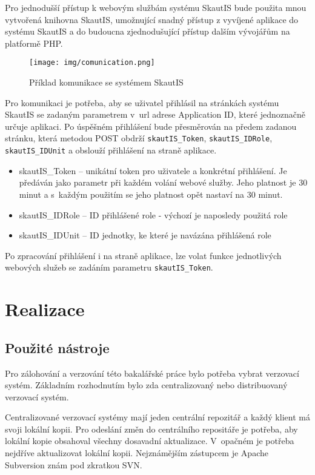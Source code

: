 \documentclass[thesis=B,czech]{FITthesis}[2012/04/27]
\begin{document}
Pro jednodušší přístup k webovým službám systému SkautIS bude použita mnou vytvořená knihovna SkautIS, umožnující snadný přístup z vyvíjené aplikace do systému SkautIS a do budoucna zjednodušující přístup dalším vývojářům na platformě PHP.

\begin{figure}[h] \centering
 	\texttt{[image: img/comunication.png]}
 	\caption[SkautIS]{Příklad komunikace se systémem SkautIS}\label{fig:comunication-diagram}
\end{figure}

Pro komunikaci je potřeba, aby se uživatel přihlásil na stránkách systému SkautIS se zadaným parametrem v~url adrese Application ID, které jednoznačně určuje aplikaci. Po úspěšném přihlášení bude přesměrován na předem zadanou stránku, která metodou POST obdrží \texttt{skautIS\_Token}, \texttt{skautIS\_ID\-Role}, \texttt{skautIS\_IDUnit} a obslouží přihlášení na straně aplikace.

\begin{itemize}
	\item skautIS\_Token -- unikátní token pro uživatele a konkrétní přihlášení. Je předáván jako parametr při každém volání webové služby. Jeho platnost je 30 minut a s~každým použitím se jeho platnost opět nastaví na 30 minut. 
	\item skautIS\_IDRole -- ID přihlášené role - výchozí je naposledy použitá role 
	\item skautIS\_IDUnit -- ID jednotky, ke které je navázána přihlášená role 
\end{itemize}

Po zpracování přihlášení i na straně aplikace, lze volat funkce jednotlivých webových služeb se zadáním parametru \texttt{skautIS\_Token}.

\chapter{Realizace}

\section{Použité nástroje}
Pro zálohování a verzování této bakalářské práce bylo potřeba vybrat verzovací systém. Základním rozhodnutím bylo zda centralizovaný nebo distribuovaný verzovací systém.

Centralizované verzovací systémy mají jeden centrální repozitář a každý klient má svoji lokální kopii. Pro odeslání změn do centrálního repositáře je potřeba, aby lokální kopie obsahoval všechny dosavadní aktualizace. V~opačném je potřeba nejdříve aktualizovat lokální kopii. Nejznámějším zástupcem je Apache Subversion znám pod zkratkou SVN.
\end{document}
